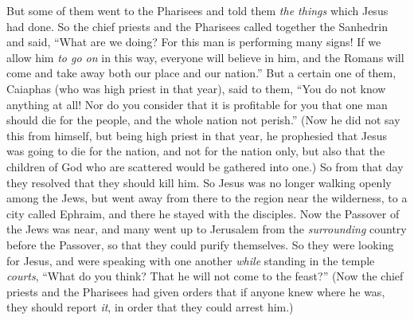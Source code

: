 \begin{biblechapter}
\verse But some of them went to the Pharisees and told them \textit{the things} which Jesus had done.
\verse So the chief priests and the Pharisees called together the Sanhedrin and said, “What are we doing? For this man is performing many signs!
\verse If we allow him \textit{to go on} in this way, everyone will believe in him, and the Romans will come and take away both our place and our nation.”
\verse But a certain one of them, Caiaphas (who was high priest in that year), said to them, “You do not know anything at all!
\verse Nor do you consider that it is profitable for you that one man should die for the people, and the whole nation not perish.”
\verse (Now he did not say this from himself, but being high priest in that year, he prophesied that Jesus was going to die for the nation,
\verse and not for the nation only, but also that the children of God who are scattered would be gathered into one.)
\verse So from that day they resolved that they should kill him.
\verse So Jesus was no longer walking openly among the Jews, but went away from there to the region near the wilderness, to a city called Ephraim, and there he stayed with the disciples.
\verse Now the Passover of the Jews was near, and many went up to Jerusalem from the \textit{surrounding} country before the Passover, so that they could purify themselves.
\verse So they were looking for Jesus, and were speaking with one another \textit{while} standing in the temple \textit{courts}, “What do you think? That he will not come to the feast?”
\verse (Now the chief priests and the Pharisees had given orders that if anyone knew where he was, they should report \textit{it}, in order that they could arrest him.)
\end{biblechapter}

